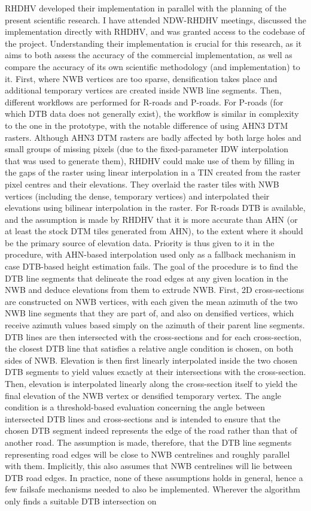 RHDHV developed their implementation in parallel with the planning of the present scientific research. I have attended NDW-RHDHV meetings, discussed the implementation directly with RHDHV, and was granted access to the codebase of the project. Understanding their implementation is crucial for this research, as it aims to both assess the accuracy of the commercial implementation, as well as compare the accuracy of its own scientific methodology (and implementation) to it. First, where NWB vertices are too sparse, densification takes place and additional temporary vertices are created inside NWB line segments. Then, different workflows are performed for R-roads and P-roads. For P-roads (for which DTB data does not generally exist), the workflow is similar in complexity to the one in the prototype, with the notable difference of using AHN3 DTM rasters. Although AHN3 DTM rasters are badly affected by both large holes and small groups of missing pixels (due to the fixed-parameter IDW interpolation that was used to generate them), RHDHV could make use of them by filling in the gaps of the raster using linear interpolation in a TIN created from the raster pixel centres and their elevations. They overlaid the raster tiles with NWB vertices (including the dense, temporary vertices) and interpolated their elevations using bilinear interpolation in the raster. For R-roads DTB is available, and the assumption is made by RHDHV that it is more accurate than AHN (or at least the stock DTM tiles generated from AHN), to the extent where it should be the primary source of elevation data. Priority is thus given to it in the procedure, with AHN-based interpolation used only as a fallback mechanism in case DTB-based height estimation fails. The goal of the procedure is to find the DTB line segments that delineate the road edges at any given location in the NWB and deduce elevations from them to extrude NWB. First, 2D cross-sections are constructed on NWB vertices, with each given the mean azimuth of the two NWB line segments that they are part of, and also on densified vertices, which receive azimuth values based simply on the azimuth of their parent line segments. DTB lines are then intersected with the cross-sections and for each cross-section, the closest DTB line that satisfies a relative angle condition is chosen, on both sides of NWB. Elevation is then first linearly interpolated inside the two chosen DTB segments to yield values exactly at their intersections with the cross-section. Then, elevation is interpolated linearly along the cross-section itself to yield the final elevation of the NWB vertex or densified temporary vertex. The angle condition is a threshold-based evaluation concerning the angle between intersected DTB lines and cross-sections and is intended to ensure that the chosen DTB segment indeed represents the edge of the road rather than that of another road. The assumption is made, therefore, that the DTB line segments representing road edges will be close to NWB centrelines and roughly parallel with them. Implicitly, this also assumes that NWB centrelines will lie between DTB road edges. In practice, none of these assumptions holds in general, hence a few failsafe mechanisms needed to also be implemented. Wherever the algorithm only finds a suitable DTB intersection on 